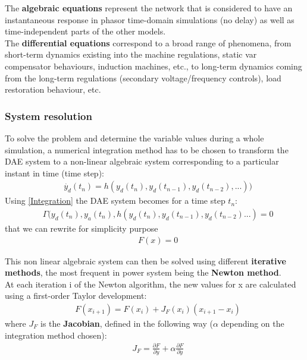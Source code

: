 \documentclass[a4paper, 12pt]{report}
\begin{document}
The \textbf{algebraic equations} represent the network that is considered to have an instantaneous response in phasor time-domain simulations (no delay) as well as time-independent parts of the other models.\\

The \textbf{differential equations} correspond to a broad range of phenomena, from short-term dynamics existing into the machine regulations, static var compensator behaviours, induction machines, etc., to long-term dynamics coming from the long-term regulations (secondary voltage/frequency controls), load restoration behaviour, etc.

\subsubsection{System resolution}
\label{Dynawo_Solver_System_Resolution}

To solve the problem and determine the variable values during a whole simulation, a numerical integration method has to be chosen to transform the \ac{DAE} system to a non-linear algebraic system corresponding to a particular instant in time (time step):
\begin{equation}
\begin{aligned}
& \dot{y_d}(t_n) = h(y_d(t_n), y_d(t_{n-1}), y_d(t_{n-2}), ...))
\end{aligned}
\label{Integration}
\end{equation}
Using \eqref{Integration} the \ac{DAE} system becomes for a time step $t_n$:
\begin{equation}
\begin{aligned}
& \Gamma(y_d(t_n), y_a(t_n), h(y_d(t_n), y_d(t_{n-1}), y_d(t_{n-2}) ...) = 0
\end{aligned}
\end{equation}
that we can rewrite for simplicity purpose
\begin{equation}
\begin{aligned}
& F(x) = 0
\end{aligned}
\label{Correction}
\end{equation}

This non linear algebraic system can then be solved using different \textbf{iterative methods}, the most frequent in power system being the \textbf{Newton method}. \\

At each iteration i of the Newton algorithm, the new values for x are calculated using a first-order Taylor development:
\begin{equation}
\begin{aligned}
& F(x_{i+1}) = F(x_i) + J_F(x_i)(x_{i+1} - x_i)
\end{aligned}
\label{Newton}
\end{equation}
where $J_F$ is the \textbf{Jacobian}, defined in the following way ($\alpha$ depending on the integration method chosen):
\begin{equation}
\begin{aligned}
& J_F = \frac{\partial F}{\partial y} + \alpha \frac{\partial F}{\partial \dot{y}}
\end{aligned}
\end{equation}
\end{document}
